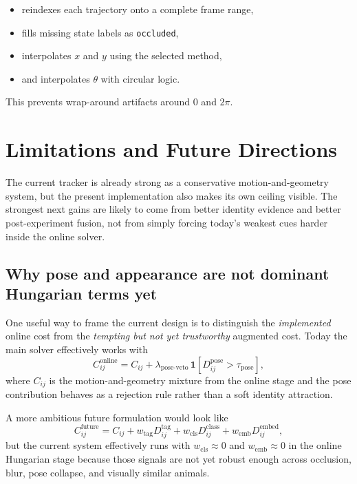 \documentclass[11pt]{article}
\begin{document}
\begin{itemize}
  \item reindexes each trajectory onto a complete frame range,
  \item fills missing state labels as \texttt{occluded},
  \item interpolates $x$ and $y$ using the selected method,
  \item and interpolates $\theta$ with circular logic.
\end{itemize}

This prevents wrap-around artifacts around $0$ and $2\pi$.

\section{Limitations and Future Directions}

The current tracker is already strong as a conservative motion-and-geometry system, but the present implementation also makes its own ceiling visible. The strongest next gains are likely to come from better identity evidence and better post-experiment fusion, not from simply forcing today's weakest cues harder inside the online solver.

\subsection{Why pose and appearance are not dominant Hungarian terms yet}

One useful way to frame the current design is to distinguish the \emph{implemented} online cost from the \emph{tempting but not yet trustworthy} augmented cost. Today the main solver effectively works with
\begin{equation}
  C^{\text{online}}_{ij}
  =
  C_{ij}
  +
  \lambda_{\text{pose-veto}} \,\mathbf{1}\!\left[D^{\text{pose}}_{ij} > \tau_{\text{pose}}\right],
\end{equation}
where $C_{ij}$ is the motion-and-geometry mixture from the online stage and the pose contribution behaves as a rejection rule rather than a soft identity attraction.

A more ambitious future formulation would look like
\begin{equation}
  C^{\text{future}}_{ij}
  =
  C_{ij}
  + w_{\text{tag}} D^{\text{tag}}_{ij}
  + w_{\text{cls}} D^{\text{class}}_{ij}
  + w_{\text{emb}} D^{\text{embed}}_{ij},
\end{equation}
but the current system effectively runs with $w_{\text{cls}} \approx 0$ and $w_{\text{emb}} \approx 0$ in the online Hungarian stage because those signals are not yet robust enough across occlusion, blur, pose collapse, and visually similar animals.
\end{document}
